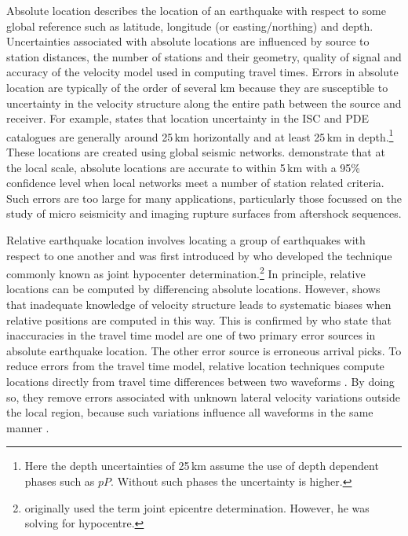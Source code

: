 \documentclass[extra]{gji}
\begin{document}
Absolute location describes the location of an earthquake
with respect to some global reference such as latitude, longitude (or
easting/northing) and depth. Uncertainties associated with absolute locations
are influenced by source to station distances, the number of
stations and their geometry, quality of signal and accuracy of
the velocity model used in computing travel times. Errors in absolute location are typically of the
order of several km because they are susceptible to uncertainty in the velocity
structure along the entire path between the source and receiver.
For example, \citet{dr_Shearer99a} states that location uncertainty
in the ISC and PDE catalogues are generally around 25\,km horizontally and
at least 25\,km in depth.\footnote{Here the depth uncertainties of 25\,km assume the use
of depth dependent phases such as $pP$. Without such phases the uncertainty is higher.}
  These locations are created using global seismic networks.
\citet{dr_Bondar04a} demonstrate
that at the local scale, absolute locations are accurate to within 5\,km with a 95\%
confidence level when local networks meet a number of station
related criteria. Such errors are too large for many applications, particularly
those focussed on the study of micro seismicity and imaging
rupture surfaces from aftershock sequences.

Relative earthquake location involves locating a group of earthquakes with
respect to one another and was first introduced by \citet{dr_Douglas67a}
who developed the technique commonly known as joint hypocenter
determination.\footnote{\citet{dr_Douglas67a} originally used the term
joint epicentre determination. However, he was solving for hypocentre.}
In principle, relative locations can be
computed by differencing absolute locations. However, \citet{dr_Pavlis92a}
shows that inadequate knowledge of velocity structure leads to
systematic biases when relative positions are computed in this way.
This is confirmed by \citet{dr_Richards06a}
who state that inaccuracies in the travel time model are one of
two primary error sources in absolute earthquake location. The other
error source is erroneous arrival picks. To reduce errors from the travel
time model, relative location techniques compute locations
directly from travel time differences between two waveforms
\citep[e.g., ][]{dr_Ito85a, dr_Got94a, dr_Nadeau97a, dr_Waldhauser99a}.
By doing so, they remove errors
associated with unknown lateral velocity variations outside the
local region, because such variations influence all waveforms in
the same manner \citep{dr_Shearer99a}.
\end{document}
